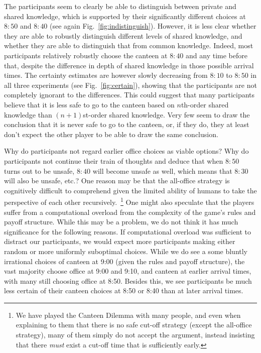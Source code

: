 \documentclass[twocolumn,a4paper,superscriptaddress,nofootinbib]{revtex4}
\newcommand{\add}[1]{{\color{green2} Add: #1}}
\begin{document}
The participants seem to clearly be able to distinguish between private and shared knowledge, which is supported by their significantly different choices at $8{:}50$ and $8{:}40$ (see again Fig.~\ref{fig:indistinguish}). However, it is less clear whether they are able to robustly distinguish different levels of shared knowledge, and whether they are able to distinguish that from common knowledge. Indeed, most participants relatively robustly choose the canteen at $8{:}40$ and any time before that, despite the difference in depth of shared knowledge in those possible arrival times. The certainty estimates are however slowly decreasing from $8{:}10$ to $8{:}50$ in all three experiments (see Fig.~\ref{fig:certain}), showing that the participants are not completely ignorant to the differences. This could suggest that many participants believe that it is less safe to go to the canteen based on $n$th-order shared knowledge than $(n+1)$st-order shared knowledge. Very few seem to draw the conclusion that it is never safe to go to the canteen, or, if they do, they at least don't expect the other player to be able to draw the same conclusion. 

Why do participants not regard earlier office choices as viable options? Why do participants not continue their train of thoughts and deduce that when $8{:}50$ turns out to be unsafe, $8{:}40$ will become unsafe as well, which means that $8{:}30$ will also be unsafe, etc.? One reason may be that the all-office strategy is cognitively difficult to comprehend given the  limited  ability of humans to take the perspective of each other recursively.~\footnote{We have played the Canteen Dilemma with many people, and even when explaining to them that there is no safe cut-off strategy (except the all-office strategy), many of them simply do not accept the argument, instead insisting that there \emph{must} exist a cut-off time that is sufficiently early.} 
One might also speculate that the players suffer from a 
computational overload from the complexity of the game's rules and payoff structure. While this may be a problem, we do not think it has much significance for the following reasons. If computational overload was sufficient to distract our participants, we would expect more participants making either random or more uniformly suboptimal choices. While we do see a some bluntly irrational choices of canteen at 9:00 (given the rules and payoff structure), the vast majority choose office at 9:00 and 9:10, and canteen at earlier arrival times, with many still choosing office at 8:50. Besides this, we see participants be much less certain of their canteen choices at 8:50 or 8:40 than at later arrival times. 
\end{document}
